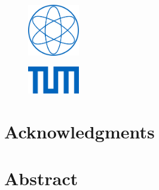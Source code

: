 \begin{titlepage}
\begin{center}
        \vfill
        \begin{figure}[h]
            \centering
            \includegraphics[width=0.2\textwidth]{assets/Physics.png}
        \end{figure}
        \begin{figure}[h]
            \centering
            \includegraphics[width=0.2\textwidth]{assets/TUM.png}
        \end{figure}
        
    \end{center}
\end{titlepage}

\newpage
\section*{Acknowledgments}
\lipsum[1]

\newpage
\section*{Abstract}
\lipsum[2]
